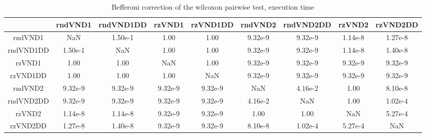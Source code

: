 \documentclass[12pt,a4paper]{article}
\begin{document}
\begin{table}[!h]
\leftskip -1.6cm
{
\footnotesize
\begin{tabular}{|*{9}{c|}}
  \hline
	 & rndVND1 & rndVND1DD & rzVND1 & rzVND1DD & rndVND2 & rndVND2DD & rzVND2 & rzVND2DD \\
  \hline
	rndVND1 & NaN & 1.50e-1 & 1.00 & 1.00 & 9.32e-9 & 9.32e-9 & 1.14e-8 & 1.27e-8 \\
	rndVND1DD & 1.50e-1 & NaN & 1.00 & 1.00 & 9.32e-9 & 9.32e-9 & 1.14e-8 & 1.40e-8 \\
	rzVND1 & 1.00 & 1.00 & NaN & 1.00 & 9.32e-9 & 9.32e-9 & 9.32e-9 & 9.32e-9 \\
	rzVND1DD & 1.00 & 1.00 & 1.00 & NaN & 9.32e-9 & 9.32e-9 & 9.32e-9 & 9.32e-9 \\
	rndVND2 & 9.32e-9 & 9.32e-9 & 9.32e-9 & 9.32e-9 & NaN & 4.16e-2 & 1.00 & 8.10e-8 \\
	rndVND2DD & 9.32e-9 & 9.32e-9 & 9.32e-9 & 9.32e-9 & 4.16e-2 & NaN & 1.00 & 1.02e-4 \\
	rzVND2 & 1.14e-8 & 1.14e-8 & 9.32e-9 & 9.32e-9 & 1.00 & 1.00 & NaN & 5.27e-4 \\
	rzVND2DD & 1.27e-8 & 1.40e-8 & 9.32e-9 & 9.32e-9 & 8.10e-8 & 1.02e-4 & 5.27e-4 & NaN \\
  \hline
\end{tabular}
\normalsize
}
\caption{Befferoni correction of the wilcoxon pairwise test, execution time}
\label{Befferoni correction of the wilcoxon pairwise test VND time}
\end{table} 
\end{document}

